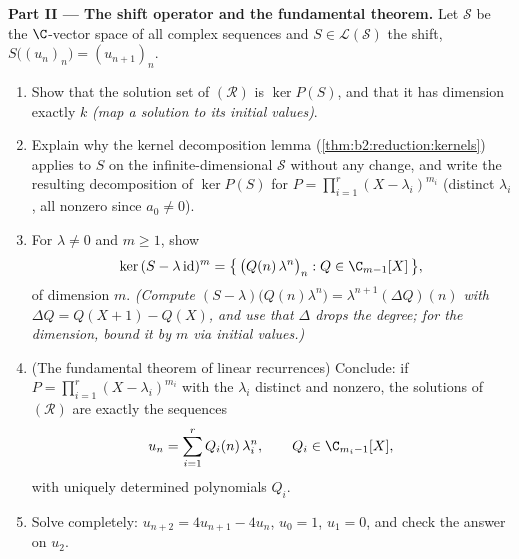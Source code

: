 \begin{problem}
\medskip
\noindent\textbf{Part II --- The shift operator and the
fundamental theorem.} Let $\mathcal{S}$ be the $\C$-vector space
of all complex sequences and $S \in
\mathcal{L}(\mathcal{S})$ the shift, $S\bigl((u_n)_n\bigr) =
(u_{n+1})_n$.
\begin{enumerate}[resume]
  \item Show that the solution set of $(\mathcal R)$ is $\ker
        P(S)$, and that it has dimension exactly $k$ \emph{(map a
        solution to its initial values)}.
  \item Explain why the kernel decomposition lemma
        (\cref{thm:b2:reduction:kernels}) applies to $S$ on the
        infinite-dimensional $\mathcal{S}$ without any change,
        and write the resulting decomposition of $\ker P(S)$ for
        $P = \prod_{i=1}^{r}(X - \lambda_i)^{m_i}$ (distinct
        $\lambda_i$, all nonzero since $a_0 \neq 0$).
  \item For $\lambda \neq 0$ and $m \geq 1$, show
        \[
        \ker\,(S - \lambda\,\mathrm{id})^m
        = \bigl\{\,\bigl(Q(n)\,\lambda^n\bigr)_n : Q \in
        \C_{m-1}[X]\,\bigr\},
        \]
        of dimension $m$. \emph{(Compute $(S -
        \lambda)\bigl(Q(n)\lambda^n\bigr) =
        \lambda^{n+1}(\Delta Q)(n)$ with $\Delta Q = Q(X + 1) -
        Q(X)$, and use that $\Delta$ drops the degree; for the
        dimension, bound it by $m$ via initial values.)}
  \item (The fundamental theorem of linear recurrences) Conclude:
        if $P = \prod_{i=1}^{r}(X - \lambda_i)^{m_i}$ with the
        $\lambda_i$ distinct and nonzero, the solutions of
        $(\mathcal R)$ are exactly the sequences
        \[
        u_n = \sum_{i=1}^{r} Q_i(n)\,\lambda_i^n,
        \qquad Q_i \in \C_{m_i - 1}[X],
        \]
        with uniquely determined polynomials $Q_i$.
  \item Solve completely: $u_{n+2} = 4u_{n+1} - 4u_n$, $u_0 =
        1$, $u_1 = 0$, and check the answer on $u_2$.
\end{enumerate}


\end{problem}
